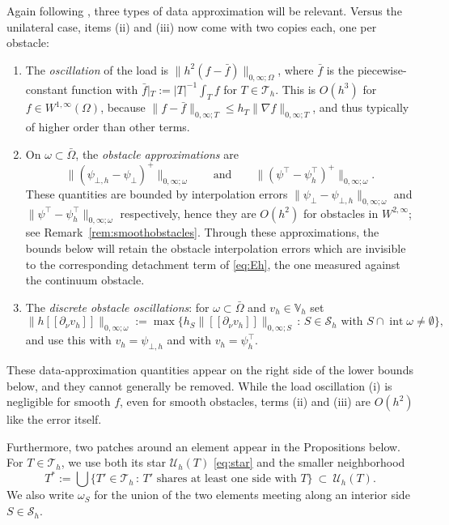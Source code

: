 \documentclass[12pt]{amsart}
\numberwithin{equation}{section}
\theoremstyle{plain}
\theoremstyle{definition}
\theoremstyle{remark}
\newcommand{\Om}{\Omega}
\newcommand{\psilo}{\psi_\bot}
\newcommand{\psiup}{\psi^\top}
\newcommand{\psiloh}{\psi_{\bot,h}}
\newcommand{\psiuph}{\psi^\top_h}
\newcommand{\Th}{\mathcal{T}_h}
\newcommand{\Vh}{\mathbb{V}_h}
\newcommand{\Sh}{\mathcal{S}_h}
\newcommand{\Uh}{\mathcal{U}_h}
\newcommand{\jump}[1]{[\![#1]\!]}
\begin{document}
Again following \cite[\S 6]{NSV03}, three types of data approximation will be relevant.  Versus the unilateral case, items (ii) and (iii) now come with two copies each, one per obstacle:
\renewcommand{\labelenumi}{(\roman{enumi})}
\begin{enumerate}
\item The \emph{oscillation} of the load is $\|h^2(f-\bar f)\|_{0,\infty;\Om}$, where $\bar f$ is the piecewise-constant function with $\bar f|_T := |T|^{-1}\int_T f$ for $T \in \Th$.  This is $O(h^3)$ for $f \in W^{1,\infty}(\Om)$, because $\|f-\bar f\|_{0,\infty;T} \le h_T\|\nabla f\|_{0,\infty;T}$, and thus typically of higher order than other terms.
\item On $\omega\subset\bar\Om$, the \emph{obstacle approximations} are
\begin{equation}
\label{eq:obstacleapprox}
  \|(\psiloh - \psilo)^+\|_{0,\infty;\omega} \qquad\text{and}\qquad \|(\psiup - \psiuph)^+\|_{0,\infty;\omega}.
\end{equation}
These quantities are bounded by interpolation errors $\|\psilo-\psiloh\|_{0,\infty;\omega}$ and $\|\psiup-\psiuph\|_{0,\infty;\omega}$ respectively, hence they are $O(h^2)$ for obstacles in $W^{2,\infty}$; see Remark~\ref{rem:smoothobstacles}.  Through these approximations, the bounds below will retain the obstacle interpolation errors which are invisible to the corresponding detachment term of \eqref{eq:Eh}, the one measured against the continuum obstacle.
\item The \emph{discrete obstacle oscillations}: for $\omega \subset \bar\Om$ and $v_h \in \Vh$ set
\begin{equation}
\label{eq:jumposc}
  \bigl\|h\jump{\partial_\nu v_h}\bigr\|_{0,\infty;\omega}
  := \max\bigl\{ h_S \bigl\|\jump{\partial_\nu v_h}\bigr\|_{0,\infty;S} \,:\, S \in \Sh \text{ with } S \cap \operatorname{int}\omega \ne \emptyset \bigr\},
\end{equation}
and use this with $v_h = \psiloh$ and with $v_h = \psiuph$.
\end{enumerate}

These data-approximation quantities appear on the right side of the lower bounds below, and they cannot generally be removed.  While the load oscillation (i) is negligible for smooth $f$, even for smooth obstacles, terms (ii) and (iii) are $O(h^2)$ like the error itself.

Furthermore, two patches around an element appear in the Propositions below.  For $T\in\Th$, we use both its star $\Uh(T)$ \eqref{eq:star} and the smaller neighborhood
\begin{equation}
\label{eq:Tstar}
  T^* := \bigcup\{T' \in \Th \,:\, T' \text{ shares at least one side with } T\} \ \subset\ \Uh(T).
\end{equation}
We also write $\omega_S$ for the union of the two elements meeting along an interior side $S \in \Sh$.
\end{document}
